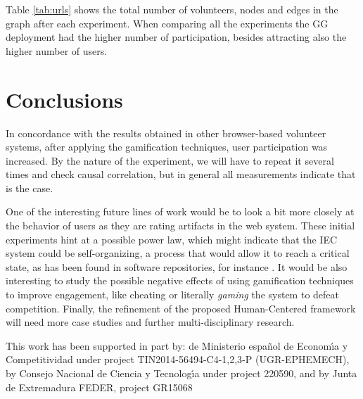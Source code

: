 Table \ref{tab:urls} shows the total number of volunteers, nodes and edges 
in the graph after each experiment. 
When comparing all the experiments the GG deployment had the higher
number of participation, besides attracting also the higher number of users.    

  
\section{Conclusions}
\label{sec:conclusions}

In concordance with the results obtained in other 
browser-based volunteer systems, after 
applying the gamification techniques, user participation was
increased. By the nature of the experiment, we will have to repeat it
several times and check causal correlation, but in general all
measurements indicate that is the case. 

One of the interesting future lines of work would be to look a bit
more closely at the behavior of users as they are rating artifacts 
in the web system. These initial experiments hint at a possible power law, which might indicate that
the IEC system could be self-organizing, a process that would allow it
to reach a critical state, as has been found in software repositories,
for instance \cite{Merelo2016:repomining}. It would be also
interesting to study the possible negative effects of using   
gamification techniques to improve engagement, like cheating or
literally {\em gaming} the system to defeat competition. 
Finally, the refinement of the proposed Human-Centered framework will need
more case studies and further multi-disciplinary research. 

\begin{acks}
This work has been supported in part by: de Ministerio espa\~{n}ol de Econom\'{\i}a y Competitividad under project TIN2014-56494-C4-{1,2,3}-P (UGR-EPHEMECH), by Consejo Nacional de Ciencia y Tecnolog\'{\i}a under project 220590, and by Junta de Extremadura FEDER, project GR15068




\end{acks}
